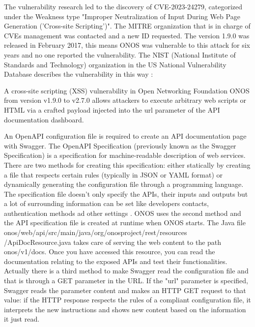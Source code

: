 The vulnerability research led to the discovery of CVE-2023-24279, categorized under the Weakness type "Improper Neutralization of Input During Web Page Generation ('Cross-site Scripting')". The MITRE organization that is in charge of CVEs management was contacted and a new ID requested. The version 1.9.0 was released in February 2017, this means ONOS was vulnerable to this attack for six years and no one reported the vulnerability. The NIST (National Institute of Standards and Technology) organization in the US National Vulnerability Database describes the vulnerability in this way \cite{CVE-2023-24279}:
\begin{quoting}[font=itshape, begintext={"}, endtext={"}]
A cross-site scripting (XSS) vulnerability in Open Networking Foundation ONOS from version v1.9.0 to v2.7.0 allows attackers to execute arbitrary web scripts or HTML via a crafted payload injected into the url parameter of the API documentation dashboard.
\end{quoting}
An OpenAPI configuration file is required to create an API documentation page with Swagger. The OpenAPI Specification (previously known as the Swagger Specification) is a specification for machine-readable description of web services. There are two methods for creating this specification: either statically by creating a file that respects certain rules (typically in JSON or YAML format) or dynamically generating the configuration file through a programming language. The specification file doesn't only specify the APIs, their inputs and outputs but a lot of surrounding information can be set like developers contacts, authentication methods ad other settings \cite{openapi}. ONOS uses the second method and the API specification file is created at runtime when ONOS starts. The Java file onos/web/api/src/main/java/org/onosproject/rest/resources
/ApiDocResource.java takes care of serving the web content to the path onos/v1/docs. Once you have accessed this resource, you can read the documentation relating to the exposed APIs and test their functionalities. Actually there is a third method to make Swagger read the configuration file and that is through a GET parameter in the URL. If the "url" parameter is specified, Swagger reads the parameter content and makes an HTTP GET request to that value: if the HTTP response respects the rules of a compliant configuration file, it interprets the new instructions and shows new content based on the information it just read.
